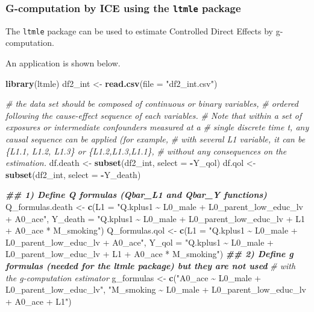 \documentclass[
]{book}
\newenvironment{Shaded}{\begin{snugshade}}{\end{snugshade}}
\newcommand{\AttributeTok}[1]{\textcolor[rgb]{0.13,0.29,0.53}{#1}}
\newcommand{\CommentTok}[1]{\textcolor[rgb]{0.56,0.35,0.01}{\textit{#1}}}
\newcommand{\DocumentationTok}[1]{\textcolor[rgb]{0.56,0.35,0.01}{\textbf{\textit{#1}}}}
\newcommand{\FunctionTok}[1]{\textcolor[rgb]{0.13,0.29,0.53}{\textbf{#1}}}
\newcommand{\NormalTok}[1]{#1}
\newcommand{\OtherTok}[1]{\textcolor[rgb]{0.56,0.35,0.01}{#1}}
\newcommand{\SpecialCharTok}[1]{\textcolor[rgb]{0.81,0.36,0.00}{\textbf{#1}}}
\newcommand{\StringTok}[1]{\textcolor[rgb]{0.31,0.60,0.02}{#1}}
\begin{document}
\subsubsection{\texorpdfstring{G-computation by ICE using the \texttt{ltmle} package}{G-computation by ICE using the ltmle package}}\label{g-computation-by-ice-using-the-ltmle-package}

The \texttt{ltmle} package can be used to estimate Controlled Direct Effects by g-computation.

An application is shown below.

\begin{Shaded}
\begin{Highlighting}[]
\FunctionTok{library}\NormalTok{(ltmle)}
\NormalTok{df2\_int }\OtherTok{\textless{}{-}} \FunctionTok{read.csv}\NormalTok{(}\AttributeTok{file =} \StringTok{"df2\_int.csv"}\NormalTok{)}

\CommentTok{\# the data set should be composed of continuous or binary variables,}
\CommentTok{\# ordered following the cause{-}effect sequence of each variables.}
\CommentTok{\# Note that within a set of exposures or intermediate confounders measured at a}
\CommentTok{\# single discrete time t, any causal sequence can be applied (for example,}
\CommentTok{\# with several L1 variable, it can be \{L1.1, L1.2, L1.3\} or \{L1.2,L1.3,L1.1\},}
\CommentTok{\# without any consequences on the estimation.}
\NormalTok{df.death }\OtherTok{\textless{}{-}} \FunctionTok{subset}\NormalTok{(df2\_int, }\AttributeTok{select =} \SpecialCharTok{{-}}\NormalTok{Y\_qol)}
\NormalTok{df.qol }\OtherTok{\textless{}{-}} \FunctionTok{subset}\NormalTok{(df2\_int, }\AttributeTok{select =} \SpecialCharTok{{-}}\NormalTok{Y\_death)}

\DocumentationTok{\#\# 1) Define Q formulas (Qbar\_L1 and Qbar\_Y functions)}
\NormalTok{Q\_formulas.death }\OtherTok{\textless{}{-}} \FunctionTok{c}\NormalTok{(}\AttributeTok{L1 =} \StringTok{"Q.kplus1 \textasciitilde{} L0\_male + L0\_parent\_low\_educ\_lv + A0\_ace"}\NormalTok{,}
                      \AttributeTok{Y\_death =} \StringTok{"Q.kplus1 \textasciitilde{} L0\_male + L0\_parent\_low\_educ\_lv + L1 +}
\StringTok{                                 A0\_ace * M\_smoking"}\NormalTok{)}
\NormalTok{Q\_formulas.qol }\OtherTok{\textless{}{-}} \FunctionTok{c}\NormalTok{(}\AttributeTok{L1 =} \StringTok{"Q.kplus1 \textasciitilde{} L0\_male + L0\_parent\_low\_educ\_lv + A0\_ace"}\NormalTok{,}
                    \AttributeTok{Y\_qol =} \StringTok{"Q.kplus1 \textasciitilde{} L0\_male + L0\_parent\_low\_educ\_lv + L1 +}
\StringTok{                             A0\_ace * M\_smoking"}\NormalTok{)}
\DocumentationTok{\#\# 2) Define g formulas (needed for the ltmle package) but they are not used}
\CommentTok{\#    with the g{-}computation estimator}
\NormalTok{g\_formulas }\OtherTok{\textless{}{-}} \FunctionTok{c}\NormalTok{(}\StringTok{"A0\_ace \textasciitilde{} L0\_male + L0\_parent\_low\_educ\_lv"}\NormalTok{,}
                \StringTok{"M\_smoking \textasciitilde{} L0\_male + L0\_parent\_low\_educ\_lv + A0\_ace + L1"}\NormalTok{)}


\end{Highlighting}
\end{Shaded}
\end{document}
